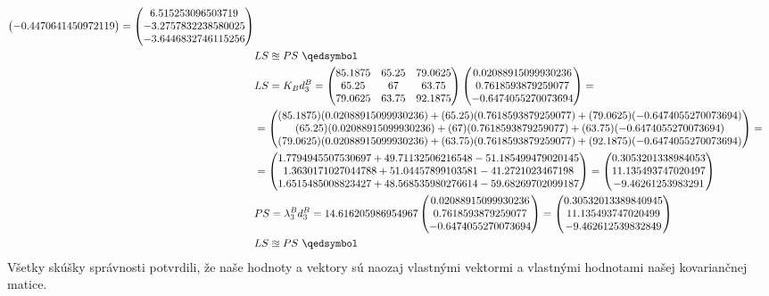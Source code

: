 \documentclass[a4paper]{article}
\begin{document}
\begin{align*}
\begin{pmatrix}
			-0.4470641450972119
		\end{pmatrix} = 
		\begin{pmatrix}
			6.515253096503719 \\
			-3.2757832238580025 \\
			-3.6446832746115256
		\end{pmatrix}
		\\
		&LS \approxeq PS \text{  }\qedsymbol
		\\
		&LS=K_B d_3^B= \begin{pmatrix}
			85.1875 & 65.25 & 79.0625 \\
			65.25 & 67 & 63.75 \\
			79.0625 & 63.75 & 92.1875
		\end{pmatrix}
		\begin{pmatrix}
			0.02088915099930236  \\
			0.7618593879259077  \\
			-0.6474055270073694
		\end{pmatrix}=
		\\
		&=\begin{pmatrix}
			(85.1875)(0.02088915099930236) + (65.25)(0.7618593879259077) + (79.0625)(-0.6474055270073694) \\
			(65.25)(0.02088915099930236) + (67)(0.7618593879259077) + (63.75)(-0.6474055270073694) \\
			(79.0625)(0.02088915099930236) + (63.75)(0.7618593879259077) + (92.1875)(-0.6474055270073694)
		\end{pmatrix}=
		\\
		&=\begin{pmatrix}
			1.7794945507530697 + 49.71132506216548 -51.185499479020145 \\
			1.3630171027044788 + 51.04457899103581 -41.2721023467198 \\
			1.6515485008823427 + 48.568535980276614 -59.68269702099187
		\end{pmatrix}=
		\begin{pmatrix}
			0.3053201338984053 \\
			11.135493747020497 \\
			-9.46261253983291
		\end{pmatrix}
		\\
		&PS=\lambda_3^B d_3^B= 14.616205986954967 \begin{pmatrix}
			0.02088915099930236  \\
			0.7618593879259077  \\
			-0.6474055270073694
		\end{pmatrix} = 
		\begin{pmatrix}
			0.30532013389840945 \\
			11.135493747020499 \\
			-9.462612539832849
		\end{pmatrix}
		\\
		&LS \approxeq PS \text{  }\qedsymbol
		\\
	\end{align*}
	Všetky skúšky správnosti potvrdili, že naše hodnoty a vektory sú naozaj vlastnými vektormi a vlastnými hodnotami našej kovariančnej matice.
	\newpage
\end{document}
